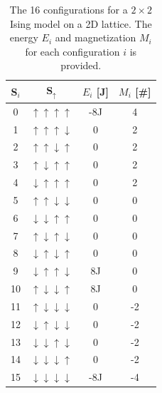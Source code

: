 \documentclass[%
reprint,nofootinbib,
amsmath,amssymb,
aps,
]{revtex4-1}
\begin{document}
\begin{table}[!h]
	\caption{\label{bc} The 16 configurations for a $2\times 2$ Ising model on a 2D lattice. The energy $E_i$ and magnetization $M_i$ for each configuration $i$ is provided.}
	\begin{tabular}{|c|c|c|c|} \hline 
		S$_i$&S$_\uparrow$ & \textbf{$E_i$} [J]&$ M_i$ [\#] \\ \hline   
		0& $\uparrow\uparrow\uparrow\uparrow$ &-8J&4\\
		1&$\uparrow\uparrow\uparrow\downarrow$ & 0&2\\
		2&$\uparrow\uparrow\downarrow\uparrow$ &0&2\\
		3&$\uparrow\downarrow\uparrow\uparrow$ &0&2\\
		4&$\downarrow\uparrow\uparrow\uparrow$ &0&2\\
		5&$\uparrow\uparrow\downarrow\downarrow$ &0&0\\
		6&$\downarrow\downarrow\uparrow\uparrow$ &0&0\\
		7&$\uparrow\downarrow\uparrow\downarrow$ &0&0\\
		8&$\downarrow\uparrow\downarrow\uparrow$ &0&0\\
		9&$\downarrow\uparrow\uparrow\downarrow$ &8J&0\\
		10&$\uparrow\downarrow\downarrow\uparrow$ &8J&0\\
		11&$\uparrow\downarrow\downarrow\downarrow$ &0&-2\\
		12&$\downarrow\uparrow\downarrow\downarrow$ &0&-2\\
		13&$\downarrow\downarrow\uparrow\downarrow$ &0&-2\\
		14&$\downarrow\downarrow\downarrow\uparrow$ &0&-2\\
		15&$\downarrow\downarrow\downarrow\downarrow$ &-8J&-4\\\hline 
	\end{tabular}
\end{table}
\end{document}

